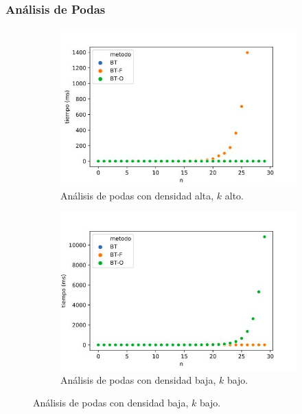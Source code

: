 \documentclass[10pt,a4paper]{article}
\begin{document}
\subsubsection{Análisis de Podas}
\begin{figure}[h!]
	\centering
	\begin{subfigure}{0.45\linewidth}
		\centering
		\includegraphics[scale=0.4]{img/bt-podas-alta.jpg}
		\caption{Análisis de podas con densidad alta, $k$ alto.}
		\label{fig:bt-poda-alto}
	\end{subfigure}
	\begin{subfigure}{0.45\linewidth}
		\centering
		\includegraphics[scale=0.4]{img/bt-podas-baja.jpg}
		\caption{Análisis de podas con densidad baja, $k$ bajo.}
		\label{fig:bt-poda-bajo}
	\end{subfigure}
	\label{fig:exp-bt-podas}
\end{figure}
\end{document}
